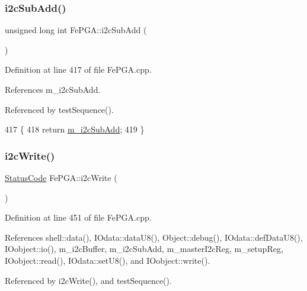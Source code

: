 \subsubsection{\texorpdfstring{i2c\+Sub\+Add()}{i2cSubAdd()}}
{\footnotesize\ttfamily unsigned long int Fe\+P\+G\+A\+::i2c\+Sub\+Add (\begin{DoxyParamCaption}{ }\end{DoxyParamCaption})}



Definition at line 417 of file Fe\+P\+G\+A.\+cpp.



References m\+\_\+i2c\+Sub\+Add.



Referenced by test\+Sequence().


\begin{DoxyCode}
417                                   \{
418   \textcolor{keywordflow}{return} \hyperlink{classFePGA_aba8c2c8d8e0d136826b9dd4c2d7c2e90}{m\_i2cSubAdd}; 
419 \}
\end{DoxyCode}
\mbox{\label{classFePGA_a27b9c9bb486cea35b1bbcac5da96f527}} 
\subsubsection{\texorpdfstring{i2c\+Write()}{i2cWrite()}\hspace{0.1cm}{\footnotesize\ttfamily [1/2]}}
{\footnotesize\ttfamily \hyperlink{classStatusCode}{Status\+Code} Fe\+P\+G\+A\+::i2c\+Write (\begin{DoxyParamCaption}{ }\end{DoxyParamCaption})}



Definition at line 451 of file Fe\+P\+G\+A.\+cpp.



References shell\+::data(), I\+Odata\+::data\+U8(), Object\+::debug(), I\+Odata\+::def\+Data\+U8(), I\+Oobject\+::io(), m\+\_\+i2c\+Buffer, m\+\_\+i2c\+Sub\+Add, m\+\_\+master\+I2c\+Reg, m\+\_\+setup\+Reg, I\+Oobject\+::read(), I\+Odata\+::set\+U8(), and I\+Oobject\+::write().



Referenced by i2c\+Write(), and test\+Sequence().


